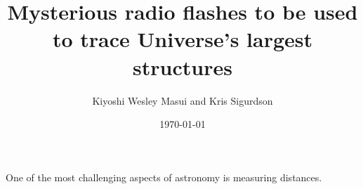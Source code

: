 \documentclass{article}
\title{Mysterious radio flashes to be used to trace Universe's largest
structures}
\date{\today}
\author{Kiyoshi Wesley Masui and Kris Sigurdson}
\begin{document}
\maketitle

One of the most challenging aspects of astronomy is measuring distances.
\end{document}
